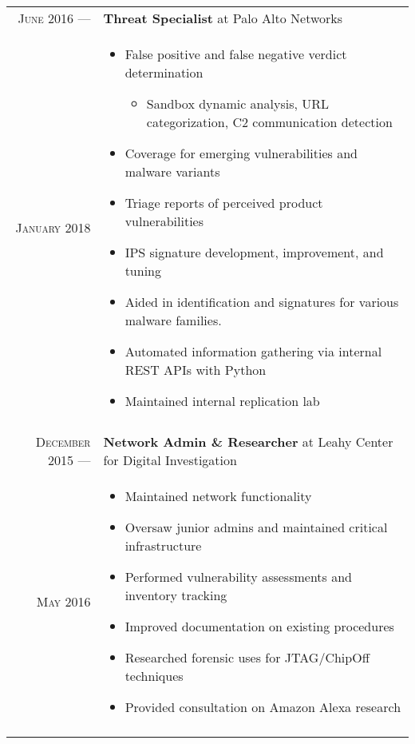 \documentclass[a4paper,10pt]{article}
\begin{document}
\begin{tabular}{r|p{11cm}}
 \textsc{June 2016} ---            & \textbf {Threat Specialist} at Palo Alto Networks \\
 \textsc{January 2018} \hphantom{---} & \footnotesize{
        \vspace{-2mm}
        \begin{itemize}[leftmargin=*]
            \item False positive and false negative verdict determination
            \begin{itemize}
                \item Sandbox dynamic analysis, URL categorization, C2 communication detection
            \end{itemize}
            \item Coverage for emerging vulnerabilities and malware variants
            \item Triage reports of perceived product vulnerabilities 
            \item IPS signature development, improvement, and tuning 
            \item Aided in identification and signatures for various malware families.
            \item Automated information gathering via internal REST APIs with Python
            \item Maintained internal replication lab
        \end{itemize}
        \vspace*{-\baselineskip}
    }\\
 \multicolumn{2}{c}{} \\

 \textsc{December 2015} ---            & \textbf {Network Admin \& Researcher} at Leahy Center for Digital Investigation \\
 \textsc{May 2016} \hphantom{---} & \footnotesize{
        \vspace{-2mm}
         \begin{itemize}[leftmargin=*]
            \item Maintained network functionality
            \item Oversaw junior admins and maintained critical infrastructure 
            \item Performed vulnerability assessments and inventory tracking
            \item Improved documentation on existing procedures
            \item Researched forensic uses for JTAG/ChipOff techniques
            \item Provided consultation on Amazon Alexa research
        \end{itemize}
        \vspace*{-\baselineskip}
    }\\
\multicolumn{2}{c}{} \\


\end{tabular}
\end{document}
